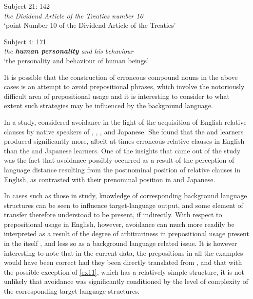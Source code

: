 \documentclass[output=paper]{langsci/langscibook}
\begin{document}
\begin{exe}  
  \ex{}
  {Subject 21: 142}\\
    \textit{the Dividend Article of the Treaties number 10}\\
    {‘point Number 10 of the Dividend Article of the Treaties’}
  \label{ex13}
\end{exe}


\begin{exe}  
  \ex{}
  {Subject 4: 171}\\
    \textit{the \textbf{human personality} and his behaviour}\\
    {‘the personality and behaviour of human beings’}
  \label{ex15}
\end{exe}

It is possible that the construction of erroneous compound nouns in
the above cases is an attempt to avoid prepositional phrases, which
involve the notoriously difficult area of prepositional usage
\citep{Jain1974} and it is interesting to consider to what extent such
strategies may be influenced by the background language.

In a  study, \citet{Schachter1974} considered avoidance in
the light of the acquisition of English relative clauses by native
speakers of , , , and Japanese. She found that the
 and  learners produced significantly more, albeit at
times erroneous relative clauses in English than the  and
Japanese learners. One of the insights that came out of the study was
the fact that avoidance possibly occurred as a result of the
perception of language distance resulting from the postnominal
position of relative clauses in English, as contrasted with their
prenominal position in  and Japanese.


In cases such as those in  study, knowledge of
corresponding background language structures can be seen to influence
target-language output, and some element of transfer therefore
understood to be present, if indirectly. With respect to prepositional
usage in English, however, avoidance can much more readily be
interpreted as a result of the degree of arbitrariness in
prepositional usage present in the  itself
\citep{Jain1974}, and less so as a background language related
issue. It is however interesting to note that in the current data, the
prepositions in all the examples would have been correct had they been
directly translated from , and that with the possible exception
of \ref{ex11}, which has a relatively simple structure, it is not
unlikely that avoidance was significantly conditioned by the level of
complexity of the corresponding target-language structures.
\end{document}
